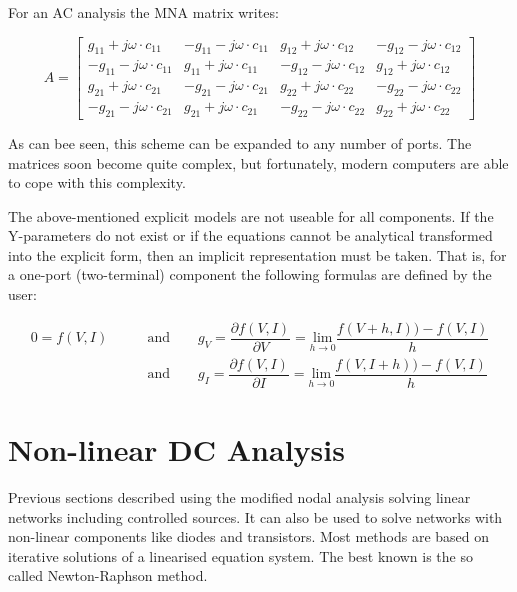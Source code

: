 For an AC analysis the MNA matrix writes:

\begin{equation}
A =
\begin{bmatrix}
 g_{11} + j\omega\cdot c_{11} & -g_{11} - j\omega\cdot c_{11} &  g_{12} + j\omega\cdot c_{12} & -g_{12} - j\omega\cdot c_{12}\\
-g_{11} - j\omega\cdot c_{11} &  g_{11} + j\omega\cdot c_{11} & -g_{12} - j\omega\cdot c_{12} &  g_{12} + j\omega\cdot c_{12}\\
 g_{21} + j\omega\cdot c_{21} & -g_{21} - j\omega\cdot c_{21} &  g_{22} + j\omega\cdot c_{22} & -g_{22} - j\omega\cdot c_{22}\\
-g_{21} - j\omega\cdot c_{21} &  g_{21} + j\omega\cdot c_{21} & -g_{22} - j\omega\cdot c_{22} &  g_{22} + j\omega\cdot c_{22}
\end{bmatrix}
\end{equation}

As can bee seen, this scheme can be expanded to any number of ports.
The matrices soon become quite complex, but fortunately, modern
computers are able to cope with this complexity.

\addvspace{12pt}

The above-mentioned explicit models are not useable for all components.
If the Y-parameters do not exist or if the equations cannot be
analytical transformed into the explicit form, then an implicit
representation must be taken. That is, for a one-port (two-terminal)
component the following formulas are defined by the user:

\begin{align}
0 = f(V, I) \qquad & \text{and}\qquad
  g_V = \dfrac{\partial f(V, I)}{\partial V}
      = \underset{h\rightarrow 0}{\text{lim}}\dfrac{f(V+h, I)) - f(V, I)}{h}\\
                   & \text{and}\qquad
  g_I = \dfrac{\partial f(V, I)}{\partial I}
      = \underset{h\rightarrow 0}{\text{lim}}\dfrac{f(V, I+h)) - f(V, I)}{h}
\end{align}


\section{Non-linear DC Analysis}

Previous sections described using the modified nodal analysis solving
linear networks including controlled sources.  It can also be used to
solve networks with non-linear components like diodes and transistors.
Most methods are based on iterative solutions of a linearised equation
system.  The best known is the so called Newton-Raphson method.

